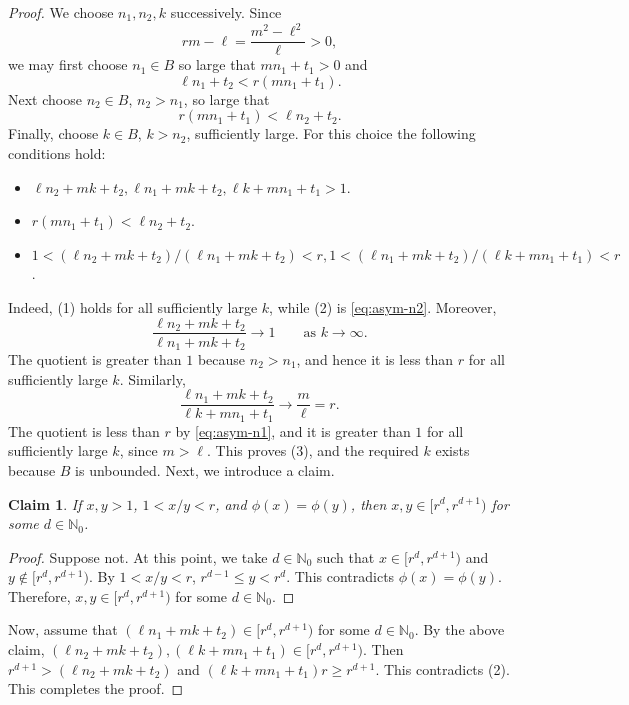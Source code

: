 \documentclass[reqno,12pt]{amsart}
\newtheorem{cl}{Claim}
\newcommand{\Nzero}{\mathbb N_0}
\numberwithin{equation}{section}
\begin{document}
\begin{proof}
We choose $n_1,n_2,k$ successively. Since
\[
 rm-\ell=\frac{m^2-\ell^2}{\ell}>0,
\]
we may first choose $n_1\in B$ so large that $mn_1+t_1>0$ and
\begin{equation}\label{eq:asym-n1}
 \ell n_1+t_2<r(mn_1+t_1).
\end{equation}
Next choose $n_2\in B$, $n_2>n_1$, so large that
\begin{equation}\label{eq:asym-n2}
 r(mn_1+t_1)<\ell n_2+t_2.
\end{equation}
Finally, choose $k\in B$, $k>n_2$, sufficiently large. For this choice
the following conditions hold:
\begin{itemize}
\item[(1)] $\ell n_2+mk+t_2,\ell n_1+mk+t_2,\ell k+mn_1+t_1>1$.
\item[(2)] $r(mn_{1}+t_1)<\ell n_2+t_2$.
\item[(3)] $1<(\ell n_2+mk+t_2)/(\ell n_1+mk+t_2)<r,1<(\ell n_1+mk+t_2)/(\ell k+mn_1+t_1)<r$.
\end{itemize}
Indeed, (1) holds for all sufficiently large $k$, while (2) is
\eqref{eq:asym-n2}. Moreover,
\[
 \frac{\ell n_2+mk+t_2}{\ell n_1+mk+t_2}\longrightarrow1
 \qquad\text{as }k\to\infty.
\]
The quotient is greater than $1$ because $n_2>n_1$, and hence it is
less than $r$ for all sufficiently large $k$. Similarly,
\[
 \frac{\ell n_1+mk+t_2}{\ell k+mn_1+t_1}\longrightarrow
 \frac m\ell=r.
\]
The quotient is less than $r$ by \eqref{eq:asym-n1}, and it is greater
than $1$ for all sufficiently large $k$, since $m>\ell$. This proves
(3), and the required $k$ exists because $B$ is unbounded.
Next, we introduce a claim.
\begin{cl}
	If $x,y>1$, $1<x/y<r$, and $\phi(x)=\phi(y)$, then $x,y\in [r^d,r^{d+1})$ for some $d\in \Nzero$.
\end{cl}
\begin{proof}
	Suppose not. At this point, we take $d\in \Nzero$ such that $x\in [r^d,r^{d+1})$ and $y\notin [r^d,r^{d+1})$. By $1<x/y<r$, $r^{d-1}\le y<r^{d}$. This contradicts $\phi(x)=\phi(y)$. Therefore, $x,y\in [r^d,r^{d+1})$ for some $d\in \Nzero$.
\end{proof}
Now, assume that $(\ell n_1+mk+t_2)\in [r^d,r^{d+1})$ for some $d\in \Nzero$. By the above claim, $(\ell n_2+mk+t_2),(\ell k+mn_1+t_1)\in [r^d,r^{d+1})$. Then $r^{d+1}>(\ell n_2+mk+t_2)$ and $(\ell k+mn_1+t_1)r\ge r^{d+1}$. This contradicts (2). This completes the proof.

\end{proof}
\end{document}
